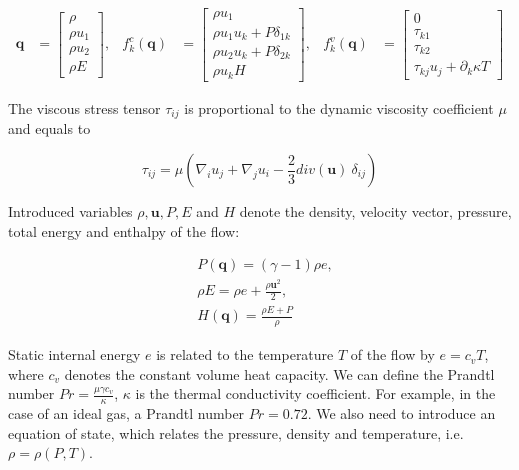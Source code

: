 \begin{align}
\label{eq:cNSFluxes}
    \textbf{q} &= \begin{bmatrix}
           \rho \\
           \rho u_1 \\
           \rho u_2 \\
           \rho E
         \end{bmatrix},&
    f_k^c(\textbf{q}) &= \begin{bmatrix}
           \rho u_1 \\
           \rho u_1 u_k + P \delta_{1k} \\
           \rho u_2 u_k + P \delta_{2k}\\
           \rho u_k H
         \end{bmatrix},&
    f_k^v(\textbf{q}) &= \begin{bmatrix}
           0 \\
           \tau_{k1} \\
           \tau_{k2} \\
           \tau_{kj}u_j + \partial_{k} \kappa T
         \end{bmatrix}
  \end{align}

The viscous stress tensor $\tau_{ij}$ is proportional to the dynamic viscosity coefficient $\mu$ and equals to

\begin{equation}
    \tau_{ij} = \mu \left( \nabla_i u_j + \nabla_j u_i - \frac{2}{3} div(\textbf{u}) \  \delta_{ij} \right)
\end{equation}

Introduced variables $\rho, \textbf{u}, P, E$ and $H$ denote the density, velocity vector, pressure, total energy and enthalpy of the flow:

\begin{subequations}
    \begin{align}
        & P(\textbf{q}) = (\gamma - 1) \rho e, \\
        &\rho E = \rho e + \frac{\rho \textbf{u}^2}{2}, \\
        &H(\textbf{q}) = \frac{\rho E + P}{\rho}
    \end{align}
\end{subequations}

Static internal energy $e$ is related to the temperature $T$ of the flow by $e = c_v T$, where $c_v$ denotes the constant volume heat capacity. We can define the Prandtl number $Pr = \frac{\mu \gamma c_v}{\kappa}$, $\kappa$ is the thermal conductivity coefficient. For example, in the case of an ideal gas, a Prandtl number $Pr = 0.72$. We also need to introduce an equation of state, which relates the pressure, density and temperature, i.e. $\rho = \rho(P,T)$.

